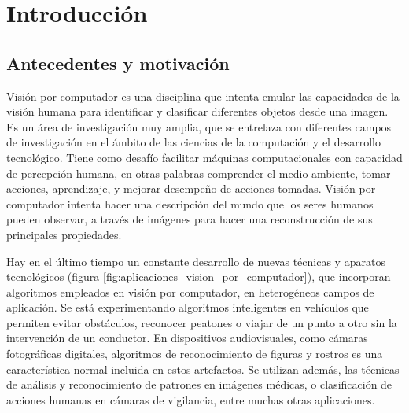 \chapter{Introducción}\label{chap:capitulo_1}
\section{Antecedentes y motivación}
\indent Visión por computador es una disciplina que intenta emular las capacidades de la visión humana para identificar y clasificar diferentes objetos desde una imagen. Es un área de investigación muy amplia, que se entrelaza con diferentes campos de investigación en el ámbito de las ciencias de la computación y el desarrollo tecnológico. Tiene como desafío facilitar máquinas computacionales con capacidad de percepción humana, en otras palabras comprender el medio ambiente, tomar acciones, aprendizaje, y mejorar desempeño de acciones tomadas. Visión por computador intenta hacer una descripción del mundo que los seres humanos pueden observar, a través de imágenes para hacer una reconstrucción de sus principales propiedades.

\indent Hay en el último tiempo un constante desarrollo de nuevas técnicas y aparatos tecnológicos (figura \ref{fig:aplicaciones_vision_por_computador}), que incorporan algoritmos empleados en visión por computador, en heterogéneos campos de aplicación. Se está experimentando algoritmos inteligentes en vehículos que permiten evitar obstáculos, reconocer peatones o viajar de un punto a otro sin la intervención de un conductor. En dispositivos audiovisuales, como cámaras fotográficas digitales, algoritmos de reconocimiento de figuras y rostros es una característica normal incluida en estos artefactos. Se utilizan además, las técnicas de análisis y reconocimiento de patrones en imágenes médicas, o clasificación de acciones humanas en cámaras de vigilancia, entre muchas otras aplicaciones.


